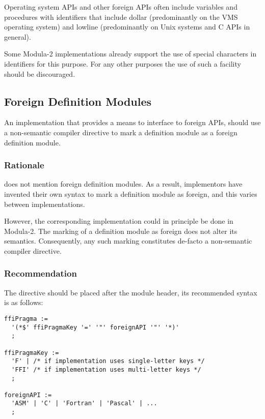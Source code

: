 \documentclass[10pt,a4paper]{article}
\begin{document}
Operating system \Glspl{API} and other \glspl{foreign API} often include
variables and procedures with identifiers that include dollar (predominantly
on the VMS operating system) and lowline (predominantly on Unix systems and
C \glspl{API} in general).

Some Modula-2 implementations already support the use of special characters in
identifiers for this purpose. For any other purposes the use of such a facility
should be discouraged.


\subsection{Foreign Definition Modules}

An implementation that provides a means to interface to \glspl{foreign API},
should use a \gls{non-semantic compiler directive} to mark a definition module
as a \gls{foreign definition module}.

\subsubsection{Rationale}

\cite{Wirth88} does not mention \glspl{foreign definition module}. As a result,
implementors have invented their own syntax to mark a definition module as
foreign, and this varies between implementations.

However, the corresponding implementation could in principle be done in
Modula-2. The marking of a definition module as foreign does not alter its
semantics. Consequently, any such marking constitutes de-facto a
\gls{non-semantic compiler directive}.

\subsubsection{Recommendation}

The directive should be placed after the module header, its recommended syntax
is as follows:

\begin{verbatim}
ffiPragma :=
  '(*$' ffiPragmaKey '=' '"' foreignAPI '"' '*)'
  ;
  
ffiPragmaKey :=
  'F' | /* if implementation uses single-letter keys */
  'FFI' /* if implementation uses multi-letter keys */
  ; 

foreignAPI :=
  'ASM' | 'C' | 'Fortran' | 'Pascal' | ...
  ;
\end{verbatim}
\end{document}
